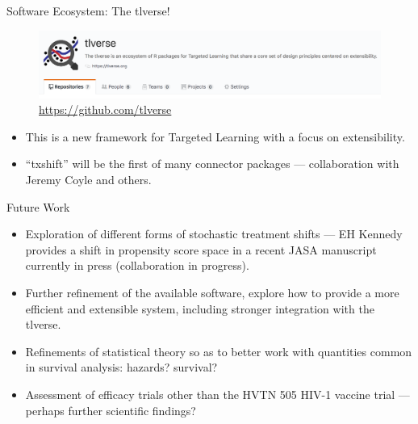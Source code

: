 \documentclass[12pt,t]{beamer}
\begin{document}
\begin{frame}[c]{Software Ecosystem: The tlverse!}

\begin{figure}[H]
  \centering
  \includegraphics[width=\textwidth]{tlverse}
  \caption{
    \url{https://github.com/tlverse}
  }
\end{figure}

\begin{center}
\begin{itemize}
  \itemsep4pt
  \item This is a new framework for Targeted Learning with a focus on
    extensibility.
  \item ``txshift'' will be the first of many connector packages ---
    collaboration with Jeremy Coyle and others.
\end{itemize}
\end{center}


\end{frame}


\begin{frame}[c]{Future Work}

\begin{center}
\begin{itemize}
  \itemsep10pt
  \item Exploration of different forms of stochastic treatment shifts --- EH
    Kennedy provides a shift in propensity score space in a recent JASA
    manuscript currently in press (collaboration in progress).
  \item Further refinement of the available software, explore how to provide a
    more efficient and extensible system, including stronger integration with
    the tlverse.
  \item Refinements of statistical theory so as to better work with quantities
    common in survival analysis: hazards? survival?
  \item Assessment of efficacy trials other than the HVTN 505 HIV-1 vaccine
    trial --- perhaps further scientific findings?
\end{itemize}
\end{center}

\note{
}

\end{frame}
\end{document}

